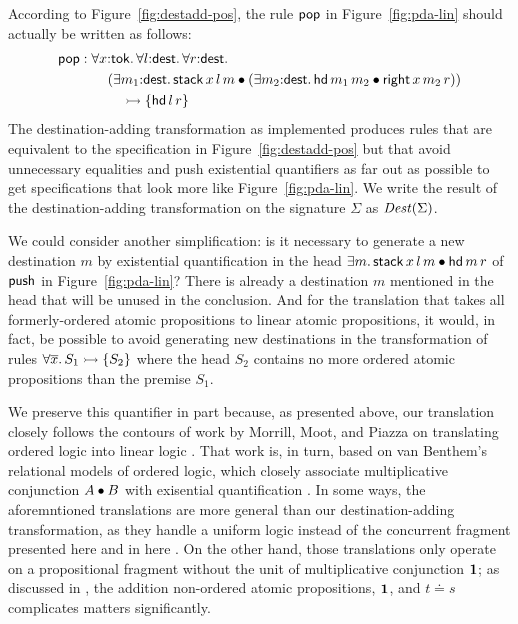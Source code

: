 According to Figure~\ref{fig:destadd-pos}, the rule 
${\sf pop}$ in Figure~\ref{fig:pda-lin} should actually be written as
follows:
\begin{align*} 
  {\sf pop} & : 
  \forall x{:}{\sf tok}.\,
  \forall l{:}{\sf dest}.\,
  \forall r{:}{\sf dest}.\,
  \\
  & \qquad (\exists m_1{:}{\sf dest}.\, {\sf stack}\,x\,l\,m \mathbin{\bullet}
   (\exists m_2{:}{\sf dest}.\, {\sf hd}\,m_1\,m_2 \mathbin{\bullet}
     {\sf right}\,x\,m_2\,r))
  \\ 
  & \qquad\quad \rightarrowtail
  \{ 
    {\sf hd}\,l\,r
  \}
\end{align*}
The destination-adding transformation as
implemented produces rules that are
equivalent to the specification in Figure~\ref{fig:destadd-pos}
but that avoid unnecessary equalities and push existential quantifiers
as far out as possible to get specifications that look more like
Figure~\ref{fig:pda-lin}. We write the result of the destination-adding
transformation on the signature $\Sigma$ as ${\it Dest}(\Sigma)$. 

We could consider another simplification: is it necessary to generate
a new destination $m$ by existential quantification in the head
$\exists m.\,{\sf stack}\,x\,l\,m \mathbin{\bullet} {\sf hd}\,m\,r$ of ${\sf
  push}$ in Figure~\ref{fig:pda-lin}? There is already a destination
$m$ mentioned in the head that will be unused in the conclusion.  And
for the translation that takes all formerly-ordered atomic
propositions to linear atomic propositions, it would, in fact, be
possible to avoid generating new destinations in the transformation of
rules $\forall \overline{x}.\,S_1 \rightarrowtail \{ S_2 \}$ where the head
$S_2$ contains no more ordered atomic propositions than the premise
$S_1$. 

We preserve this quantifier in part because, as presented above, our
translation closely follows the contours of work by Morrill, Moot, and
Piazza on translating ordered logic into linear logic
\cite{morrill95higher,moot01linguistic}. That work is, in turn, based
on van Benthem's relational models of ordered logic, which closely
associate multiplicative conjunction $A \mathbin{\bullet} B$ with exisential
quantification \cite{vanbenthem91relational}. In some ways, the
aforemntioned translations are more general than our
destination-adding transformation, as they handle a uniform logic
instead of the concurrent fragment presented here and in here
\cite{simmons11logical}. On the other hand, those translations only
operate on a propositional fragment without the unit of multiplicative
conjunction $\mathbf{1}$; as discussed in \cite[p.~57]{simmons11logical},
the addition non-ordered atomic propositions, $\mathbf{1}$, and $t \doteq s$
complicates matters significantly. 

